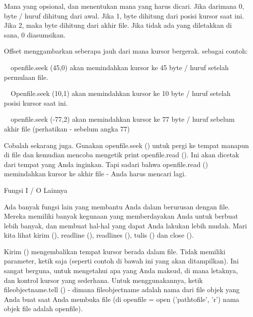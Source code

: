 \noindent 
\vspace{12pt}
\noindent 
Mana yang opsional, dan menentukan mana yang harus dicari. Jika darimana 0, byte / huruf dihitung dari awal. Jika 1, byte dihitung dari posisi kursor saat ini. Jika 2, maka byte dihitung dari akhir file. Jika tidak ada yang diletakkan di sana, 0 diasumsikan. \par
\noindent 
\vspace{12pt}
\noindent 
Offset menggambarkan seberapa jauh dari mana kursor bergerak. sebagai contoh: \par
\noindent 
\vspace{12pt}
\noindent 
 $  $ $  $ $  $ $  $openfile.seek (45,0) akan memindahkan kursor ke 45 byte / huruf setelah permulaan file. \par
\noindent 
 $  $ $  $ $  $ $  $Openfile.seek (10,1) akan memindahkan kursor ke 10 byte / huruf setelah posisi kursor saat ini. \par
\noindent 
 $  $ $  $ $  $ $  $openfile.seek (-77,2) akan memindahkan kursor ke 77 byte / huruf sebelum akhir file (perhatikan - sebelum angka 77) \par
\noindent 
\vspace{12pt}
\noindent 
Cobalah sekarang juga. Gunakan openfile.seek () untuk pergi ke tempat manapun di file dan kemudian mencoba mengetik print openfile.read (). Ini akan dicetak dari tempat yang Anda inginkan. Tapi sadari bahwa openfile.read () memindahkan kursor ke akhir file - Anda harus mencari lagi. \par
\vspace{14pt}
\noindent 
Fungsi I / O Lainnya \par
\noindent 
\vspace{12pt}
\noindent 
Ada banyak fungsi lain yang membantu Anda dalam berurusan dengan file. Mereka memiliki banyak kegunaan yang memberdayakan Anda untuk berbuat lebih banyak, dan membuat hal-hal yang dapat Anda lakukan lebih mudah. Mari kita lihat kirim (), readline (), readlines (), tulis () dan close (). \par
\noindent 
\vspace{12pt}
\noindent 
Kirim () mengembalikan tempat kursor berada dalam file. Tidak memiliki parameter, ketik saja (seperti contoh di bawah ini yang akan ditampilkan). Ini sangat berguna, untuk mengetahui apa yang Anda maksud, di mana letaknya, dan kontrol kursor yang sederhana. Untuk menggunakannya, ketik fileobjectname.tell () - dimana fileobjectname adalah nama dari file objek yang Anda buat saat Anda membuka file (di openfile = open ('pathtofile', 'r') nama objek file adalah openfile). \par
